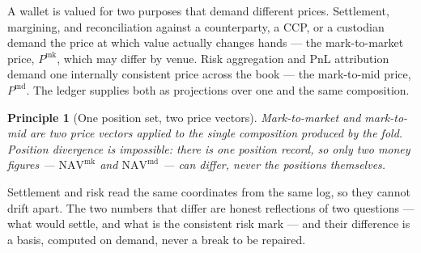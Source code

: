 \documentclass[11pt,a4paper]{article}
\newtheorem{principle}[definition]{Principle}
\begin{document}
A wallet is valued for two purposes that demand different prices. Settlement,
margining, and reconciliation against a counterparty, a CCP, or a custodian
demand the price at which value actually changes hands --- the mark-to-market
price, $P^{\mathrm{mk}}$, which may differ by venue. Risk aggregation and PnL
attribution demand one internally consistent price across the book --- the
mark-to-mid price, $P^{\mathrm{md}}$. The ledger supplies both as projections
over one and the same composition.

\begin{principle}[One position set, two price vectors]
Mark-to-market and mark-to-mid are two price vectors applied to the single
composition produced by the fold. Position divergence is impossible: there is
one position record, so only two money figures --- $\mathrm{NAV}^{\mathrm{mk}}$
and $\mathrm{NAV}^{\mathrm{md}}$ --- can differ, never the positions
themselves.
\end{principle}

Settlement and risk read the same coordinates from the same log, so they cannot drift
apart. The two numbers
that differ are honest reflections of two questions --- what would settle, and
what is the consistent risk mark --- and their difference is a basis, computed
on demand, never a break to be repaired.
\end{document}
